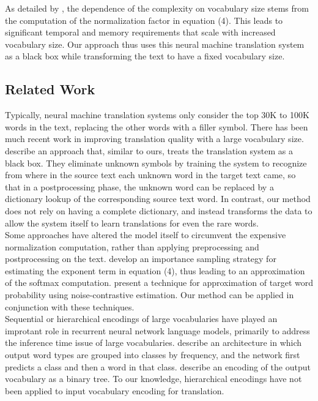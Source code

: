 As detailed by , the dependence of the complexity on vocabulary
size stems from the computation of the normalization factor in equation (4). This leads
to significant temporal and memory requirements that scale with increased vocabulary size. Our approach thus uses this neural machine
translation system as a black box while transforming the text to have a fixed vocabulary size.

\subsection{Related Work}
Typically, neural machine translation systems only consider the top 30K to 100K words in the text, replacing the other words
with a filler symbol. There has been much recent work in improving translation quality with a large vocabulary size.
 describe an approach
that, similar to ours, treats the translation system as a black box. They eliminate unknown symbols by training the
system to recognize from where in the source text each unknown word in the target text came, so that in a postprocessing
 phase, the unknown word can be replaced by a dictionary lookup of the corresponding source text word. In contrast,
our method does not rely on having a complete dictionary, and instead transforms the data to allow the system itself to
learn translations for even the rare words.\\

Some approaches have altered the model itself to circumvent the expensive normalization computation, rather than
applying preprocessing and postprocessing on the text. 
develop an importance sampling strategy for estimating the exponent term in equation (4), thus leading to
an approximation of the softmax computation. 
present a technique for approximation of target word probability using noise-contrastive estimation. Our method can
be applied in conjunction with these techniques.\\

Sequential or hierarchical encodings of large vocabularies have played an
improtant role in recurrent neural network language models, primarily to
address the inference time issue of large vocabularies. 
describe an architecture in which output word types are grouped into classes by
frequency, and the network first predicts a class and then a word in that
class.  describe an encoding of the output
vocabulary as a binary tree. To our knowledge, hierarchical encodings have not
been applied to input vocabulary encoding for translation.

